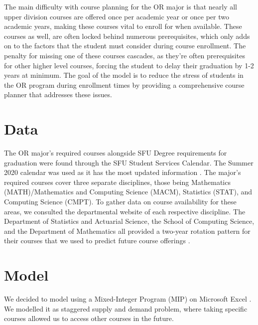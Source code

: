 \documentclass{article}
\begin{document}
The main difficulty with course planning for the OR major is that nearly all upper division courses are offered once per academic year or once per two academic years, making these courses vital to enroll for when available. These courses as well, are often locked behind numerous prerequisites, which only adds on to the factors that the student must consider during course enrollment. The penalty for missing one of these courses cascades, as they're often prerequisites for other higher level courses, forcing the student to delay their graduation by 1-2 years at minimum. The goal of the model is to reduce the stress of students in the OR program during enrollment times by providing a comprehensive course planner that addresses these issues.



\section{Data}

The OR major's required courses alongside SFU Degree requirements for graduation were found through the SFU Student Services Calendar. The Summer 2020 calendar was used as it has the most updated information \cite{ORCalendar}. The major's required courses cover three separate disciplines, those being Mathematics (MATH)/Mathematics and Computing Science (MACM), Statistics (STAT), and Computing Science (CMPT). To gather data on course availability for these areas, we consulted the departmental website of each respective discipline. The Department of Statistics and Actuarial Science, the School of Computing Science, and the Department of Mathematics all provided a two-year rotation pattern for their courses that we used to predict future course offerings\cite{CMPTCourses} \cite{STATCourses}\cite{MATHCourses}.




\section{Model}
 We decided to model using a Mixed-Integer Program (MIP) on Microsoft Excel . We modelled it as staggered supply and demand problem, where taking specific courses allowed us to access other courses in the future. 
\end{document}
